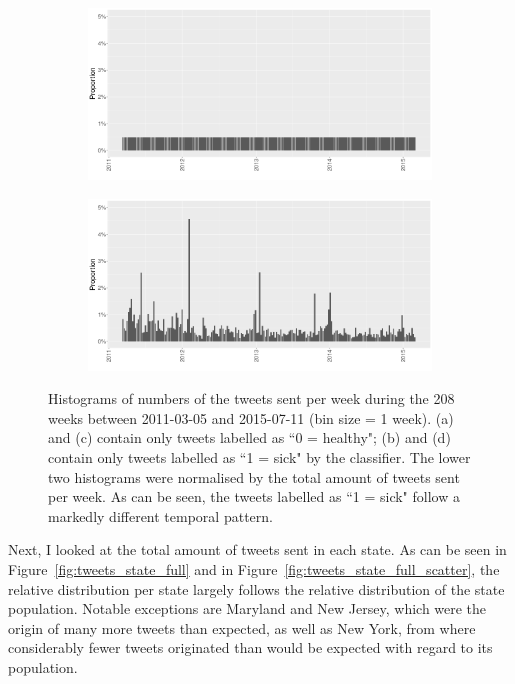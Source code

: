 \documentclass[11pt, a4paper,twoside]{report}\usepackage[]{graphicx}\usepackage[]{color}
\begin{document}
\begin{figure}[H]
    \begin{subfigure}[t]{0.49\textwidth}
  \includegraphics[width=1\linewidth]{activity_rel_healthy_date_Twitter_full_aggregated.png}
  \caption{}
  \end{subfigure}
  \hfill
    \begin{subfigure}[t]{0.49\textwidth}
  \includegraphics[width=1\linewidth]{activity_rel_sick_date_Twitter_full_aggregated.png}
  \caption{}
  \end{subfigure}
  \caption{Histograms of numbers of the tweets sent per week during the 208 weeks between 2011-03-05 and 2015-07-11 (bin size = 1 week). (a) and (c) contain only tweets labelled as ``0 = healthy"; (b) and (d) contain only tweets labelled as ``1 = sick" by the classifier. The lower two histograms were normalised by the total amount of tweets sent per week. As can be seen, the tweets labelled as ``1 = sick" follow a markedly different temporal pattern.}
  \label{fig:tweets_seasonal_healthy_sick}
\end{figure}

Next, I looked at the total amount of tweets sent in each state. As can be seen in Figure~\ref{fig:tweets_state_full} and in Figure~\ref{fig:tweets_state_full_scatter}, the relative distribution per state largely follows the relative distribution of the state population. Notable exceptions are Maryland and New Jersey, which were the origin of many more tweets than expected, as well as New York, from where considerably fewer tweets originated than would be expected with regard to its population.\newline
\end{document}
